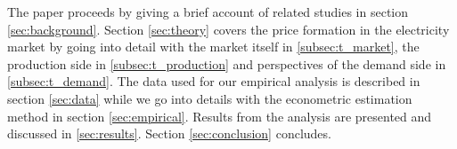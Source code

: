 The paper proceeds by giving a brief account of related studies in section \ref{sec:background}. Section \ref{sec:theory} covers the price formation in the electricity market by going into detail with the market itself in \ref{subsec:t_market}, the production side in \ref{subsec:t_production} and perspectives of the demand side in \ref{subsec:t_demand}. The data used for our empirical analysis is described in section \ref{sec:data} while we go into details with the econometric estimation method in section \ref{sec:empirical}. Results from the analysis are presented and discussed in \ref{sec:results}. Section \ref{sec:conclusion} concludes.
